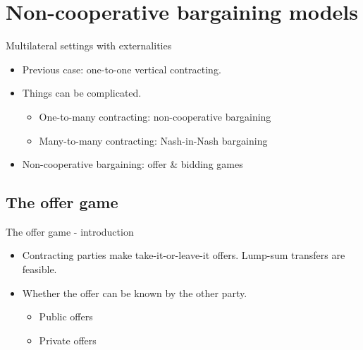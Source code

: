 \documentclass[aspectratio=169]{beamer}  %
\begin{document}
\section{Non-cooperative bargaining models}
\begin{frame}{Multilateral settings with externalities}
    \begin{itemize}
        \item Previous case: one-to-one vertical contracting. \vspace{.2cm}
        \item Things can be complicated. \vspace{.2cm}
        \begin{itemize}
            \item One-to-many contracting: non-cooperative bargaining \vspace{.2cm}
            \item Many-to-many contracting: Nash-in-Nash bargaining \vspace{.2cm}
        \end{itemize}
        \item Non-cooperative bargaining: offer \& bidding games \vspace{.2cm}
    \end{itemize}
\end{frame}



\subsection{The offer game}
\begin{frame}{The offer game - introduction}
    \begin{itemize}
        \item Contracting parties make take-it-or-leave-it offers. Lump-sum transfers are feasible. \vspace{.2cm}
        \item Whether the offer can be known by the other party. \vspace{.2cm}
        \begin{itemize}
            \item Public offers \vspace{.2cm}
            \item Private offers \vspace{.2cm}
        \end{itemize}
    \end{itemize}
\end{frame}
\end{document}
